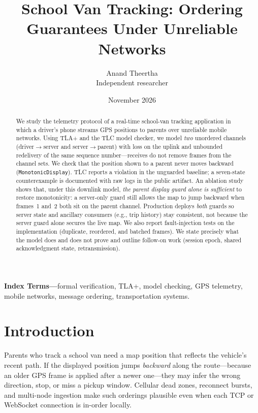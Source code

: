 \documentclass[11pt,a4paper]{article}
\title{School Van Tracking: Ordering Guarantees Under Unreliable Networks}
\author{Anand Theertha\\[0.5em]\normalsize Independent researcher}
\date{November 2026}
\begin{document}
\maketitle

\begin{abstract}
We study the telemetry protocol of a real-time school-van tracking application in which a driver's phone streams GPS positions to parents over unreliable mobile networks. Using TLA+ and the TLC model checker, we model \emph{two} unordered channels (driver$\rightarrow$server and server$\rightarrow$parent) with loss on the uplink and unbounded redelivery of the same sequence number---receives do not remove frames from the channel sets. We check that the position shown to a parent never moves backward (\texttt{MonotonicDisplay}). TLC reports a violation in the unguarded baseline; a seven-state counterexample is documented with raw logs in the public artifact. An ablation study shows that, under this downlink model, \emph{the parent display guard alone is sufficient} to restore monotonicity: a server-only guard still allows the map to jump backward when frames~1 and~2 both sit on the parent channel. Production deploys \emph{both} guards so server state and ancillary consumers (e.g., trip history) stay consistent, not because the server guard alone secures the live map. We also report fault-injection tests on the implementation (duplicate, reordered, and batched frames). We state precisely what the model does and does not prove and outline follow-on work (session epoch, shared acknowledgment state, retransmission).
\end{abstract}

\noindent\textbf{Index Terms---}formal verification, TLA+, model checking, GPS telemetry, mobile networks, message ordering, transportation systems.

\section{Introduction}
\label{sec:intro}

Parents who track a school van need a map position that reflects the vehicle's recent path. If the displayed position jumps \emph{backward} along the route---because an older GPS frame is applied after a newer one---they may infer the wrong direction, stop, or miss a pickup window. Cellular dead zones, reconnect bursts, and multi-node ingestion make such orderings plausible even when each TCP or WebSocket connection is in-order locally.
\end{document}
